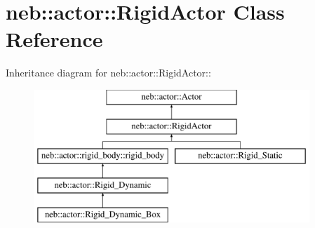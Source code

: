 \hypertarget{classneb_1_1actor_1_1RigidActor}{
\section{neb::actor::RigidActor Class Reference}
\label{classneb_1_1actor_1_1RigidActor}
}
Inheritance diagram for neb::actor::RigidActor::\begin{figure}[H]
\begin{center}
\leavevmode
\includegraphics[height=5cm]{classneb_1_1actor_1_1RigidActor}
\end{center}
\end{figure}
